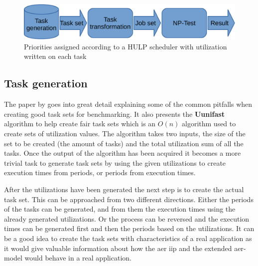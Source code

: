 \documentclass{kththesis}
\begin{document}
\begin{figure}

    \centering

    \includegraphics[width=0.8\linewidth]{images/benchmark_toolchain.pdf}

    \caption{Priorities assigned according to a HULP scheduler with utilization written on each task}

    \label{fig:benchmark_toolchain}

\end{figure}


\subsection{Task generation} \label{subsec:task_generation}

The paper by \textcite{bini_measuring_2005} goes into great detail explaining some of the common pitfalls
when creating good task sets for benchmarking. It also presents the \textbf{Uunifast} algorithm to
help create fair task sets which is an $O(n)$ algorithm used to create sets of utilization values.
The algorithm takes two inputs, the size of the set to be created (the amount of tasks) and the
total utilization sum of all the tasks. Once the output of the algorithm has been acquired it
becomes a more trivial task to generate task sets by using the given utilizations to create
execution times from periods, or periods from execution times.

After the utilizations have been generated the next step is to create the actual task set. This can
be approached from two different directions. Either the periods of the tasks can be generated, and
from them the execution times using the already generated utilizations. Or the process can be
reversed and the execution times can be generated first and then the periods based on the
utilizations. It can be a good idea to create the task sets with characteristics of a real
application as it would give valuable information about how the \acrshort{aer} \acrshort{iip} and
the extended \acrshort{aer}-model would behave in a real application.
\end{document}
